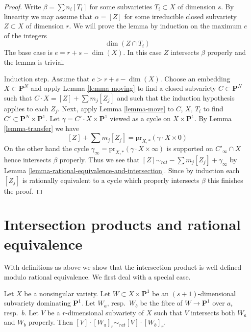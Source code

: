 \begin{proof}
Write $\beta = \sum n_i[T_i]$ for some subvarieties $T_i \subset X$
of dimension $s$. By linearity we may assume that $\alpha = [Z]$ for
some irreducible closed subvariety $Z \subset X$ of dimension $r$.
We will prove the lemma by induction on the maximum $e$ of the integers
$$
\dim(Z \cap T_i)
$$
The base case is $e = r + s - \dim(X)$. In this case $Z$ intersects
$\beta$ properly and the lemma is trivial.

\medskip\noindent
Induction step. Assume that $e > r + s - \dim(X)$. Choose an embedding
$X \subset \mathbf{P}^N$ and apply Lemma \ref{lemma-moving} to find a
closed subvariety $C \subset \mathbf{P}^N$ such that
$C \cdot X = [Z] + \sum m_j[Z_j]$ and such that the induction
hypothesis applies to each $Z_j$. Next, apply Lemma \ref{lemma-move}
to $C$, $X$, $T_i$ to find $C' \subset \mathbf{P}^N \times \mathbf{P}^1$.
Let $\gamma = C' \cdot X \times \mathbf{P}^1$ viewed as a cycle
on $X \times \mathbf{P}^1$. By Lemma \ref{lemma-transfer} we have
$$
[Z] + \sum m_j[Z_j] = \text{pr}_{X, *}(\gamma \cdot X \times 0)
$$
On the other hand the cycle
$\gamma_\infty = \text{pr}_{X, *}(\gamma \cdot X \times \infty)$
is supported on $C'_\infty \cap X$ hence intersects $\beta$ properly.
Thus we see that $[Z] \sim_{rat} - \sum m_j[Z_j] + \gamma_\infty$
by Lemma \ref{lemma-rational-equivalence-and-intersection}. Since by
induction each $[Z_j]$ is rationally equivalent to a cycle which properly
intersects $\beta$ this finishes the proof.
\end{proof}



\section{Intersection products and rational equivalence}
\label{section-intersections-and-rational-equivalence}

\noindent
With definitions as above we show that the intersection product
is well defined modulo rational equivalence. We first deal with a
special case.

\begin{lemma}
\label{lemma-well-defined-special-case}
Let $X$ be a nonsingular variety. Let
$W \subset X \times \mathbf{P}^1$ be an $(s + 1)$-dimensional subvariety
dominating $\mathbf{P}^1$. Let $W_a$, resp.\ $W_b$ be the fibre of
$W \to \mathbf{P}^1$ over $a$, resp.\ $b$. Let $V$ be a $r$-dimensional
subvariety of $X$ such that $V$ intersects both $W_a$ and
$W_b$ properly. Then $[V] \cdot [W_a]_r \sim_{rat} [V] \cdot [W_b]_r$.
\end{lemma}

